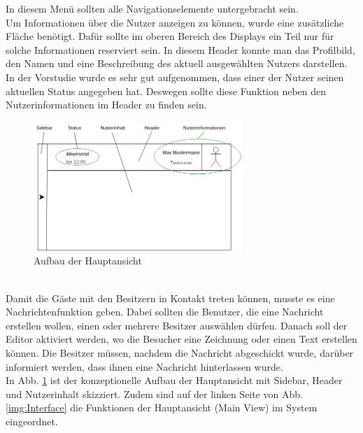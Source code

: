 In diesem Menü sollten alle Navigationselemente untergebracht sein. 
\\
Um Informationen über die Nutzer anzeigen zu können, wurde eine zusätzliche Fläche benötigt.
Dafür sollte im oberen Bereich des Displays ein Teil nur für solche Informationen reserviert sein. 
In diesem Header konnte man das Profilbild, den Namen und eine Beschreibung des aktuell ausgewählten Nutzers darstellen.
In der Vorstudie wurde es sehr gut aufgenommen, dass einer der Nutzer seinen aktuellen Status angegeben hat.
Deswegen sollte diese Funktion neben den Nutzerinformationen im Header zu finden sein.
\begin{figure}[h!]
  \centering
    \includegraphics[width=0.7\textwidth]{./img/MainViewAufbau.png}
  \caption{Aufbau der Hauptansicht}
  \label{img:mainView}
\end{figure}
\\
Damit die Gäste mit den Besitzern in Kontakt treten können, musste es eine Nachrichtenfunktion geben.
Dabei sollten die Benutzer, die eine Nachricht erstellen wollen, einen oder mehrere Besitzer auswählen dürfen.
Danach soll der Editor aktiviert werden, wo die Besucher eine Zeichnung oder einen Text erstellen können.
Die Besitzer müssen, nachdem die Nachricht abgeschickt wurde, darüber informiert werden, dass ihnen eine Nachricht hinterlassen wurde. 
\\
In Abb. \ref{img:mainView} ist der konzeptionelle Aufbau der Hauptansicht mit Sidebar, Header und Nutzerinhalt skizziert.
Zudem sind auf der linken Seite von Abb. \ref{img:Interface} die Funktionen der Hauptansicht (Main View) im System eingeordnet.

